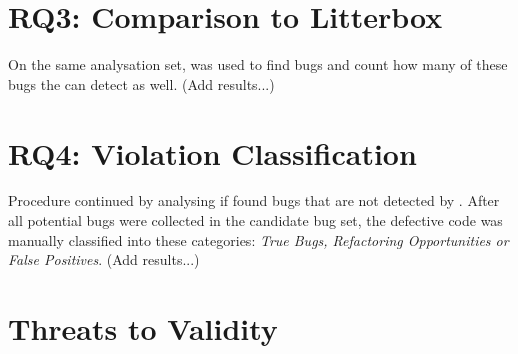 \section{RQ3: Comparison to Litterbox}\label{sec:litterbox}
On the same analysation set, \litterbox{} was used to find bugs and count how many of these bugs the \ngram{} can detect as well. (Add results...)
 
 
\section{RQ4: Violation Classification}\label{sec:violations}
Procedure  continued by analysing if \ngram{} found bugs that are not detected by \litterbox{}. After all potential bugs were collected in the candidate bug set, the defective code was manually classified into these categories: \textit{True Bugs, Refactoring Opportunities or False Positives}. (Add results...)


\section{Threats to Validity}\label{sec:threats-to-validity}


